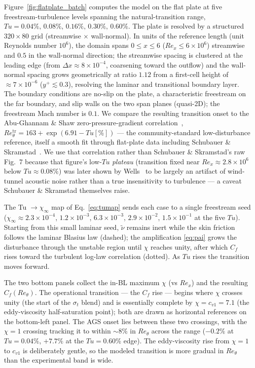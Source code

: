 \documentclass[journal]{new-aiaa}
\begin{document}
Figure~\ref{fig:flatplate_batch} computes the model on the flat plate at five
freestream-turbulence levels spanning the natural-transition
range, $Tu\!=\!0.04\%,\,0.08\%,\,0.16\%,\,0.30\%,\,0.60\%$. The plate is
resolved by a structured $320\!\times\!80$ grid (streamwise $\times$
wall-normal). In units of the reference length (unit Reynolds
number $10^6$), the domain spans $0\!\le\!x\!\le\!6$
($Re_x\!\le\!6\!\times\!10^6$) streamwise and $0.5$ in the wall-normal direction;
the streamwise spacing is clustered at the leading edge (from
$\Delta x\!\approx\!8\!\times\!10^{-4}$, coarsening toward the outflow) and the
wall-normal spacing grows geometrically at ratio $1.12$ from a first-cell height
of $\approx\!7\!\times\!10^{-6}$ ($y^+\!\lesssim\!0.3$), resolving the laminar and
transitional boundary layer. The boundary conditions are no-slip on the plate, a
characteristic freestream on the far boundary, and slip walls on the two span
planes (quasi-2D); the freestream Mach number is $0.1$. We compare the
resulting transition onset to the Abu-Ghannam \&
Shaw zero-pressure-gradient
correlation~\cite{abu_ghannam_shaw_1980}, $Re_\theta^\mathrm{tr}\!=\!163+\exp(6.91-Tu[\%])$ --- the
community-standard low-disturbance reference, itself a smooth fit through
flat-plate data including Schubauer \& Skramstad~\cite{schubauer_skramstad_1948}.
We use that correlation rather than Schubauer \& Skramstad's raw
Fig.~7 because that figure's low-$Tu$ \emph{plateau} (transition
fixed near $Re_x\!\approx\!2.8\!\times\!10^6$ below $Tu\!\approx\!0.08\%$) was
later shown by Wells~\cite{wells_1967} to be largely an artifact of
wind-tunnel acoustic noise rather than a true insensitivity to turbulence ---
a caveat Schubauer \& Skramstad themselves raise.

The Tu $\to\chi_\infty$ map of Eq.~\eqref{eq:tumap} sends each case to a single
freestream seed
($\chi_\infty\!\approx\!2.3\!\times\!10^{-4}$, $1.2\!\times\!10^{-3}$,
$6.3\!\times\!10^{-3}$, $2.9\!\times\!10^{-2}$, $1.5\!\times\!10^{-1}$ at the
five $Tu$). Starting from this small laminar seed, $\tilde\nu$ remains inert
while the skin friction follows the laminar Blasius law (dashed); the
amplification \eqref{eq:pai} grows the disturbance through the unstable region
until $\chi$ reaches unity, after which $C_f$ rises toward the turbulent
log-law correlation (dotted). As $Tu$ rises the transition moves
forward.

The two bottom panels collect the in-BL maximum
$\chi$ (vs $Re_x$) and the resulting $C_f(Re_\theta)$. The
operational transition --- the $C_f$ rise --- begins where $\chi$ crosses
unity (the start of the $\sigma_t$ blend) and is essentially complete by
$\chi\!=\!c_{v1}\!=\!7.1$ (the eddy-viscosity half-saturation point); both are
drawn as horizontal references on the bottom-left panel. The AGS onset lies
between these two
crossings, with the $\chi\!=\!1$ crossing tracking it to within $\sim\!8\%$ in
$Re_\theta$ across the range ($-0.2\%$ at $Tu\!=\!0.04\%$, $+7.7\%$ at the
$Tu\!=\!0.60\%$ edge). The eddy-viscosity rise from $\chi\!=\!1$ to $c_{v1}$ is
deliberately gentle, so the modeled transition is more gradual in $Re_\theta$ than
the experimental band is wide.
\end{document}
